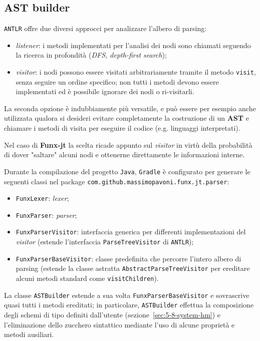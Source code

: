 \subsection{AST builder}
\label{sec:5-6-ast-builder}

\texttt{ANTLR} offre due diversi approcci per analizzare l'albero di parsing:
\begin{itemize}
    \item \textit{listener}: i metodi implementati per l'analisi dei nodi sono chiamati seguendo la ricerca
          in profondità (\textit{DFS, depth-first search});
    \item \textit{visitor}: i nodi possono essere visitati arbitrariamente tramite il metodo \texttt{visit},
          senza seguire un ordine specifico; non tutti i metodi devono essere implementati
          ed è possibile ignorare dei nodi o ri-visitarli.
\end{itemize}

\noindent La seconda opzione è indubbiamente più versatile, e può essere per esempio anche utilizzata
qualora si desideri evitare completamente la costruzione di un \textbf{AST} e chiamare i metodi di visita
per eseguire il codice (e.g. linguaggi interpretati).

\noindent Nel caso di \textbf{Funx-jt} la scelta ricade appunto sul \textit{visitor} in virtù
della probabilità di dover "saltare" alcuni nodi e ottenerne direttamente le informazioni interne.

\noindent Durante la compilazione del progetto \texttt{Java}, \texttt{Gradle} è configurato per generare
le seguenti classi nel package \texttt{com.github.massimopavoni.funx.jt.parser}:
\begin{itemize}
    \item \texttt{FunxLexer}: \textit{lexer};
    \item \texttt{FunxParser}: \textit{parser};
    \item \texttt{FunxParserVisitor}: interfaccia generica per differenti implementazioni del \textit{visitor}
          (estende l'interfaccia \texttt{ParseTreeVisitor} di \texttt{ANTLR});
    \item \texttt{FunxParserBaseVisitor}: classe predefinita che percorre l'intero albero di parsing
          (estende la classe astratta \texttt{AbstractParseTreeVisitor} per ereditare alcuni metodi standard come \texttt{visitChildren}).
\end{itemize}

\noindent La classe \texttt{ASTBuilder} estende a sua volta \texttt{FunxParserBaseVisitor} e sovrascrive quasi tutti i metodi ereditati;
in particolare, \texttt{ASTBuilder} effettua la composizione degli schemi di tipo definiti dall'utente (sezione~\ref{sec:5-8-system-hm})
e l'eliminazione dello zucchero sintattico mediante l'uso di alcune proprietà e metodi ausiliari.



